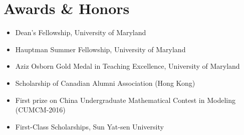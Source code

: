 \documentclass[6pt, letterpaper]{article}
\newenvironment{customItem}{
\begin{itemize}[
    topsep=0.05 cm,
    parsep=0.05 cm,
    partopsep=0pt,
    itemsep=0pt,
    leftmargin=10pt
]
}{
\end{itemize}
} %
\begin{document}


\section{Awards \& Honors}

\begin{customItem}
\item Dean’s Fellowship, University of Maryland
\item Hauptman Summer Fellowship, University of Maryland
\item Aziz Osborn Gold Medal in Teaching Excellence, University of Maryland
\item Scholarship of Canadian Alumni Association (Hong Kong)
\item First prize on China Undergraduate Mathematical Contest in Modeling (CUMCM-2016)
\item First-Class Scholarships, Sun Yat-sen University
\end{customItem}
\end{document}
